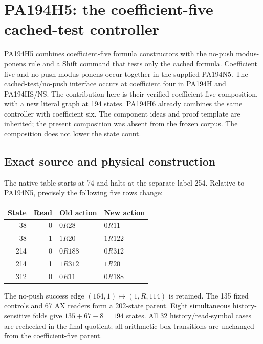 \section{PA194H5: the coefficient-five cached-test controller}
\label{sec:h5}

PA194H5 combines coefficient-five formula constructors with the no-push
modus-ponens rule and a Shift command that tests only the cached formula.
Coefficient five and no-push modus ponens occur together in the supplied
PA194N5.  The cached-test/no-push interface occurs at coefficient four in
PA194H and PA194HS/NS.  The contribution here is their verified coefficient-five composition,
with a new literal graph at 194 states.  PA194H6 already combines the same
controller with coefficient six.  The component ideas and proof template
are inherited; the present composition was absent from the frozen corpus.
The composition does not lower the state count.

\subsection{Exact source and physical construction}

The native table starts at 74 and halts at the separate label 254.
Relative to PA194N5, precisely the following five rows change:
\begin{center}
\begin{tabular}{rrll}
\toprule State & Read & Old action & New action\\\midrule
38&0&$0R28$&$0R11$\\
38&1&$1R20$&$1R122$\\
214&0&$0R188$&$0R312$\\
214&1&$1R312$&$1R20$\\
312&0&$0R11$&$0R188$\\\bottomrule
\end{tabular}
\end{center}
The no-push success edge $(164,1)\mapsto(1,R,114)$ is retained.
The 135 fixed controls and 67 AX readers form a 202-state parent.
Eight simultaneous history-sensitive folds give $135+67-8=194$ states.
All 32 history/read-symbol cases are rechecked in the final quotient;
all arithmetic-box transitions are unchanged from the coefficient-five parent.

